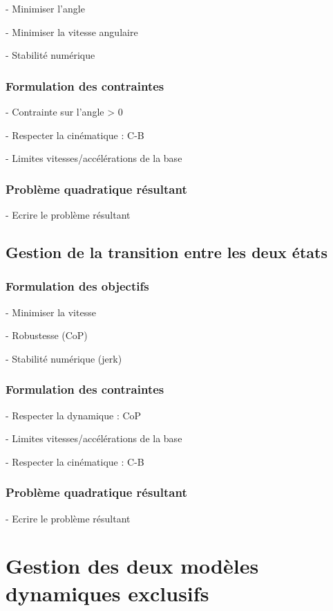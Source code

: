 				- Minimiser l'angle

				- Minimiser la vitesse angulaire

				- Stabilité numérique

			\subsubsection{Formulation des contraintes}

				- Contrainte sur l'angle > 0

				- Respecter la cinématique : C-B

				- Limites vitesses/accélérations de la base

			\subsubsection{Problème quadratique résultant}
		
				- Ecrire le problème résultant

		\subsection{Gestion de la transition entre les deux états}
			\subsubsection{Formulation des objectifs}

				- Minimiser la vitesse

				- Robustesse (CoP)

				- Stabilité numérique (jerk)

			\subsubsection{Formulation des contraintes}

				- Respecter la dynamique : CoP

				- Limites vitesses/accélérations de la base

				- Respecter la cinématique : C-B

			\subsubsection{Problème quadratique résultant}
		
				- Ecrire le problème résultant

	\section{Gestion des deux modèles dynamiques exclusifs}
